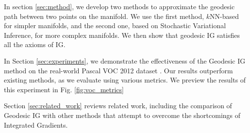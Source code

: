 In section \ref{sec:method}, we develop two methods to approximate the geodesic path between two points on the manifold. We use the first method, $k$NN-based for simpler manifolds, and the second one, based on Stochastic Variational Inference, for more complex manifolds. We then show that geodesic IG satisfies all the axioms of IG.


In Section \ref{sec:experiments}, we demonstrate the effectiveness of the Geodesic IG method on the real-world Pascal VOC 2012 dataset \citep{pascal-voc-2012}. Our results outperform existing methods, as we evaluate using various metrics. We preview the results of this experiment in Fig. \ref{fig:voc_metrics}

Section \ref{sec:related_work} reviews related work, including the comparison of Geodesic IG with other methods that attempt to overcome the shortcomings of Integrated Gradients.